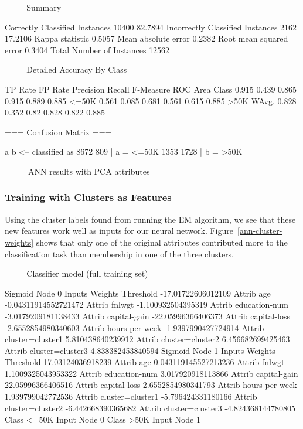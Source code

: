 \documentclass{sig-alternate}
\begin{document}
\tiny
\begin{verbbox}
=== Summary ===

Correctly Classified Instances       10400               82.7894 %
Incorrectly Classified Instances      2162               17.2106 %
Kappa statistic                          0.5057
Mean absolute error                      0.2382
Root mean squared error                  0.3404
Total Number of Instances            12562     

=== Detailed Accuracy By Class ===

       TP Rate   FP Rate   Precision   Recall  F-Measure   ROC Area  Class
         0.915     0.439      0.865     0.915     0.889      0.885     <=50K
         0.561     0.085      0.681     0.561     0.615      0.885     >50K
WAvg.    0.828     0.352      0.82      0.828     0.822      0.885

=== Confusion Matrix ===

    a    b   <-- classified as
 8672  809 |    a =  <=50K
 1353 1728 |    b =  >50K
\end{verbbox}
\normalsize

\begin{figure}[!htbp]
    \centering
    \theverbbox
    \caption{ANN results with PCA attributes\label{ann-summary-pca}}
\end{figure}



\subsubsection{Training with Clusters as Features}

Using the cluster labels found from running the EM algorithm, we see that these new features work well as inputs for our neural network. Figure~\ref{ann-cluster-weights} shows that only one of the original attributes contributed more to the classification task than membership in one of the three clusters. 


\scriptsize
\begin{verbbox}
=== Classifier model (full training set) ===

Sigmoid Node 0
    Inputs    Weights
    Threshold    -17.01722606012109
    Attrib age    -0.04311914552721472
    Attrib fnlwgt    -1.100932504395319
    Attrib education-num    -3.0179209181138433
    Attrib capital-gain    -22.05996366406373
    Attrib capital-loss    -2.6552854980340603
    Attrib hours-per-week    -1.9397990427724914
    Attrib cluster=cluster1    5.810438640239912
    Attrib cluster=cluster2    6.456682699425463
    Attrib cluster=cluster3    4.838382453840594
Sigmoid Node 1
    Inputs    Weights
    Threshold    17.03124036918239
    Attrib age    0.043119145527213236
    Attrib fnlwgt    1.1009325043953322
    Attrib education-num    3.017920918113866
    Attrib capital-gain    22.05996366406516
    Attrib capital-loss    2.6552854980341793
    Attrib hours-per-week    1.939799042772536
    Attrib cluster=cluster1    -5.796424331180166
    Attrib cluster=cluster2    -6.442668390365682
    Attrib cluster=cluster3    -4.824368144780805
Class  <=50K
    Input
    Node 0
Class  >50K
    Input
    Node 1
\end{verbbox}
\normalsize
\end{document}
